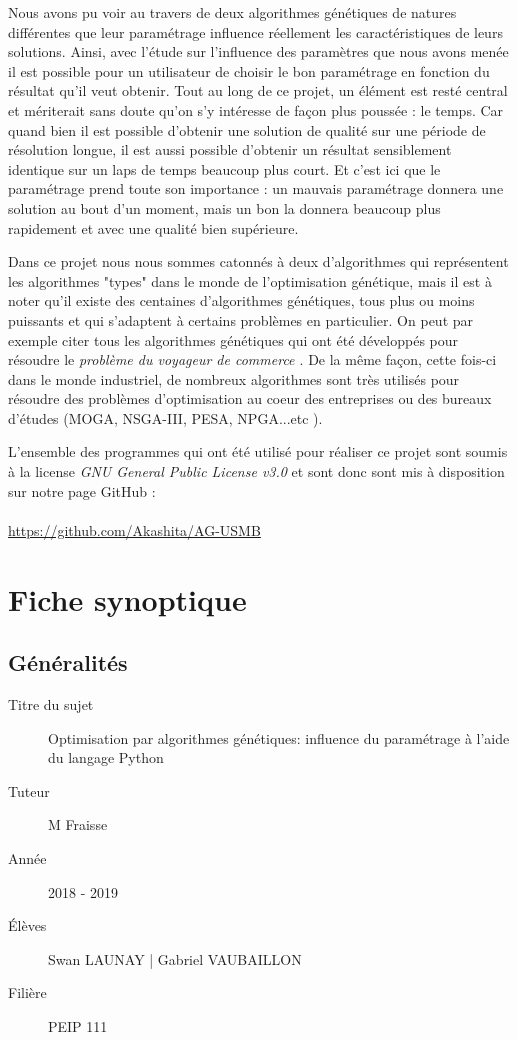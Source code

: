 \documentclass[12pt]{report}
\begin{document}
  Nous avons pu voir au travers de deux algorithmes génétiques de natures différentes que leur paramétrage influence réellement les caractéristiques de leurs solutions. Ainsi, avec l'étude sur l'influence des paramètres que nous avons menée il est possible pour un utilisateur de choisir le bon paramétrage en fonction du résultat qu'il veut obtenir.
  Tout au long de ce projet, un élément est resté central et mériterait sans doute qu'on s'y intéresse de façon plus poussée : le temps. Car quand bien il est possible d'obtenir une solution de qualité sur une période de résolution longue, il est aussi possible d'obtenir un résultat sensiblement identique sur un laps de temps beaucoup plus court. Et c'est ici que le paramétrage prend toute son importance : un mauvais paramétrage donnera une solution au bout d'un moment, mais un bon la donnera beaucoup plus rapidement et avec une qualité bien supérieure.

  Dans ce projet nous nous sommes catonnés à deux d'algorithmes qui représentent les algorithmes "types" dans le monde de l'optimisation génétique, mais il est à noter qu'il existe des centaines d'algorithmes génétiques, tous plus ou moins puissants et qui s'adaptent à certains problèmes en particulier. On peut par exemple citer tous les algorithmes génétiques qui ont été développés pour résoudre le \emph{problème du voyageur de commerce \cite{wiki7}}. De la même façon, cette fois-ci dans le monde industriel, de nombreux algorithmes sont très utilisés pour résoudre des problèmes d'optimisation au coeur des entreprises ou des bureaux d'études (MOGA, NSGA-III, PESA, NPGA...etc \cite{diapo}).


   L'ensemble des programmes qui ont été utilisé pour réaliser ce projet sont soumis à la license \emph{GNU General Public License v3.0} et sont donc sont mis à disposition sur notre page GitHub : \\\\
   \url{https://github.com/Akashita/AG-USMB}


  \appendix

  \chapter{Fiche synoptique}

  \section{Généralités}
  \begin{description}
    \item[Titre du sujet] Optimisation par algorithmes génétiques: influence du paramétrage à l’aide du langage Python
    \item[Tuteur] M Fraisse
    \item[Année] 2018 - 2019
    \item[Élèves] Swan LAUNAY | Gabriel VAUBAILLON
    \item[Filière] PEIP 111
  \end{description}
\end{document}
